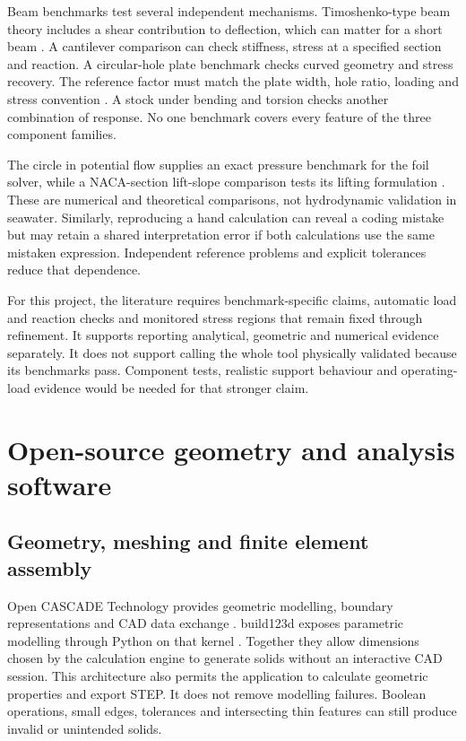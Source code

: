 Beam benchmarks test several independent mechanisms. Timoshenko-type beam theory includes a shear contribution to deflection, which can matter for a short beam \cite{timoshenko1972}. A cantilever comparison can check stiffness, stress at a specified section and reaction. A circular-hole plate benchmark checks curved geometry and stress recovery. The reference factor must match the plate width, hole ratio, loading and stress convention \cite{peterson2008}. A stock under bending and torsion checks another combination of response. No one benchmark covers every feature of the three component families.

The circle in potential flow supplies an exact pressure benchmark for the foil solver, while a NACA-section lift-slope comparison tests its lifting formulation \cite{katz2001,abbott1959}. These are numerical and theoretical comparisons, not hydrodynamic validation in seawater. Similarly, reproducing a hand calculation can reveal a coding mistake but may retain a shared interpretation error if both calculations use the same mistaken expression. Independent reference problems and explicit tolerances reduce that dependence.

For this project, the literature requires benchmark-specific claims, automatic load and reaction checks and monitored stress regions that remain fixed through refinement. It supports reporting analytical, geometric and numerical evidence separately. It does not support calling the whole tool physically validated because its benchmarks pass. Component tests, realistic support behaviour and operating-load evidence would be needed for that stronger claim.

\section{Open-source geometry and analysis software}
\label{sec:lit-open-source}

\subsection{Geometry, meshing and finite element assembly}
\label{sec:lit-open-pipeline}

Open CASCADE Technology provides geometric modelling, boundary representations and CAD data exchange \cite{occtDocs}. build123d exposes parametric modelling through Python on that kernel \cite{build123dDocs}. Together they allow dimensions chosen by the calculation engine to generate solids without an interactive CAD session. This architecture also permits the application to calculate geometric properties and export STEP. It does not remove modelling failures. Boolean operations, small edges, tolerances and intersecting thin features can still produce invalid or unintended solids.

